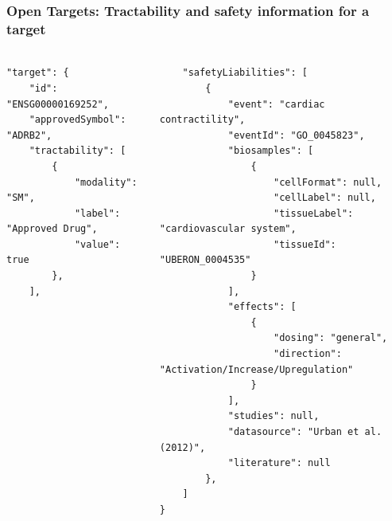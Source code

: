 \documentclass[aspectratio=169,xcolor=dvipsnames]{beamer}
\begin{document}
\begin{frame}[fragile,t]
  \frametitle{Open Targets: Tractability and safety information for a target}
  \framesubtitle{}
  \tiny
  \begin{columns}[t]
    \begin{column}{0.3\textwidth}
\begin{verbatim}
"target": {
    "id": "ENSG00000169252",
    "approvedSymbol": "ADRB2",
    "tractability": [
        {
            "modality": "SM",
            "label": "Approved Drug",
            "value": true
        },
    ],
\end{verbatim}
    \end{column}
    \begin{column}{0.7\textwidth}
\begin{verbatim}
    "safetyLiabilities": [
        {
            "event": "cardiac contractility",
            "eventId": "GO_0045823",
            "biosamples": [
                {
                    "cellFormat": null,
                    "cellLabel": null,
                    "tissueLabel": "cardiovascular system",
                    "tissueId": "UBERON_0004535"
                }
            ],
            "effects": [
                {
                    "dosing": "general",
                    "direction": "Activation/Increase/Upregulation"
                }
            ],
            "studies": null,
            "datasource": "Urban et al. (2012)",
            "literature": null
        },
    ]
}
\end{verbatim}
    \end{column}
  \end{columns}
\end{frame}
\end{document}
